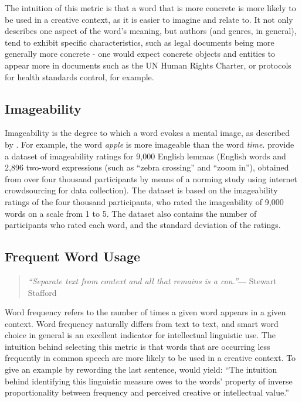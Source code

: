 The intuition of this metric is that a word that is more concrete is more likely to be used in a creative context, as it is easier to imagine and relate to. It not only describes one aspect of the word's meaning, but authors (and genres, in general), tend to exhibit specific characteristics, such as legal documents being more generally more concrete - one would expect concrete objects and entities to appear more in documents such as the UN Human Rights Charter, or protocols for health standards control, for example. 

\subsection{Imageability}
\label{imageability}
Imageability is the degree to which a word evokes a mental image, as described by \cite{degroot1989representational}. For example, the word \textit{apple} is more imageable than the word \textit{time}. \cite{brysbaert2014concreteness} provide a dataset of imageability ratings for 9,000 English lemmas (English words and 2,896 two-word expressions (such as ``zebra crossing'' and ``zoom in''), obtained from over four thousand participants by means of a norming study using internet crowdsourcing for data collection). The dataset is based on the imageability ratings of the four thousand participants, who rated the imageability of 9,000 words on a scale from 1 to 5. The dataset also contains the number of participants who rated each word, and the standard deviation of the ratings.

\subsection{Frequent Word Usage}
\label{frequency}

\begin{quote}
\textit{    “Separate text from context and all that remains is a con.”}― Stewart Stafford 
\end{quote}

Word frequency refers to the number of times a given word appears in a given context. Word frequency naturally differs from text to text, and smart word choice in general is an excellent indicator for intellectual linguistic use. The intuition behind selecting this metric is that words that are occurring less frequently in common speech are more likely to be used in a creative context. To give an example by rewording the last sentence, would yield: ``The intuition behind identifying this linguistic measure owes to the words' property of inverse proportionality between frequency and perceived creative or intellectual value.''

